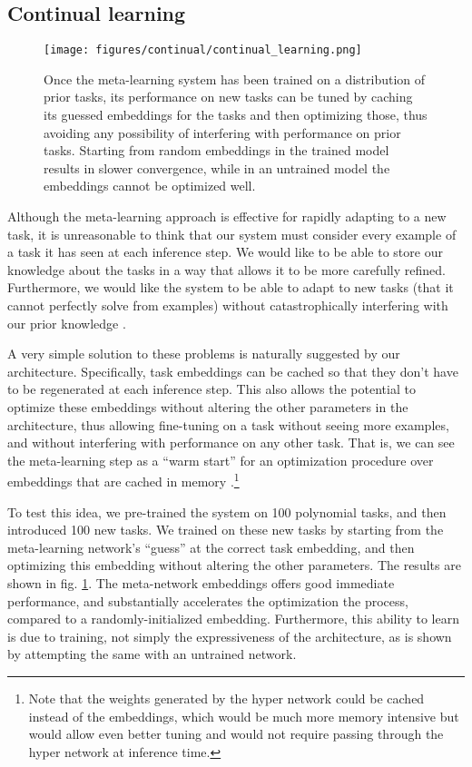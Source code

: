\documentclass{article}
\begin{document}
\subsection{Continual learning}
\begin{figure}
\centering
\texttt{[image: figures/continual/continual\_learning.png]}
\caption{Once the meta-learning system has been trained on a distribution of prior tasks, its performance on new tasks can be tuned by caching its guessed embeddings for the tasks and then optimizing those, thus avoiding any possibility of interfering with performance on prior tasks. Starting from random embeddings in the trained model results in slower convergence, while in an untrained model the embeddings cannot be optimized well.}
\label{poly_continual_results}
\end{figure}
Although the meta-learning approach is effective for rapidly adapting to a new task, it is unreasonable to think that our system must consider every example of a task it has seen at each inference step. We would like to be able to store our knowledge about the tasks in a way that allows it to be more carefully refined. Furthermore, we would like the system to be able to adapt to new tasks (that it cannot perfectly solve from examples) without catastrophically interfering with our prior knowledge \citep{McCloskey1989}. \par
A very simple solution to these problems is naturally suggested by our architecture. Specifically, task embeddings can be cached so that they don't have to be regenerated at each inference step. This also allows the potential to optimize these embeddings without altering the other parameters in the architecture, thus allowing fine-tuning on a task without seeing more examples, and without interfering with performance on any other task. That is, we can see the meta-learning step as a ``warm start'' for an optimization procedure over embeddings that are cached in memory \citep[c.f.][]{Kumaran2016}.\footnote{Note that the weights generated by the hyper network could be cached instead of the embeddings, which would be much more memory intensive but would allow even better tuning and would not require passing through the hyper network at inference time.} \par 
To test this idea, we pre-trained the system on 100 polynomial tasks, and then introduced 100 new tasks. We trained on these new tasks by starting from the meta-learning network's ``guess'' at the correct task embedding, and then optimizing this embedding without altering the other parameters. The results are shown in fig. \ref{poly_continual_results}. The meta-network embeddings offers good immediate performance, and substantially accelerates the optimization the process, compared to a randomly-initialized embedding. Furthermore, this ability to learn is due to training, not simply the expressiveness of the architecture, as is shown by attempting the same with an untrained network. \par 
\end{document}
